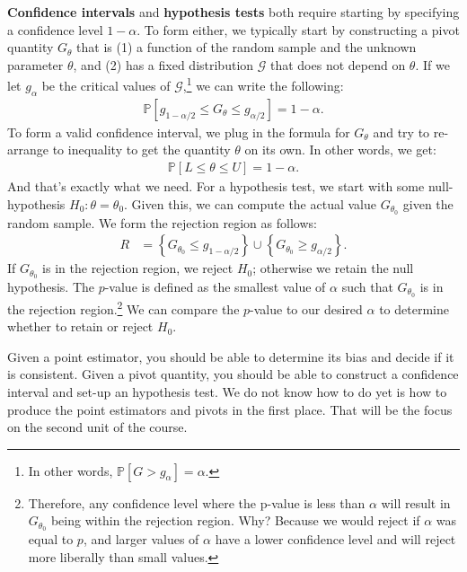 \documentclass{tufte-handout}
\begin{document}
\textbf{Confidence intervals} and \textbf{hypothesis tests}
both require starting by specifying a confidence level $1-\alpha$.
To form either, we typically start by constructing a pivot quantity
$G_\theta$ that is (1) a function of the random sample and the unknown
parameter $\theta$, and (2) has a fixed distribution $\mathcal{G}$
that does not depend on $\theta$. If we let $g_{\alpha}$ be the
critical values of $\mathcal{G}$,\footnote{
  In other words, $\mathbb{P}[G > g_{\alpha}] = \alpha$.
}
we can write the following:
\begin{align*}
\mathbb{P} \left[ g_{1 - \alpha/2} \leq G_\theta \leq g_{\alpha/2} \right] = 1 - \alpha.
\end{align*}
To form a valid confidence interval, we plug in the formula for $G_\theta$
and try to re-arrange to inequality to get the quantity $\theta$ on its
own. In other words, we get:
\begin{align*}
\mathbb{P} \left[ L \leq \theta \leq U \right] = 1 - \alpha.
\end{align*}
And that's exactly what we need. For a hypothesis test, we start with
some null-hypothesis $H_0: \theta = \theta_0$. Given this, we can
compute the actual value $G_{\theta_0}$ given the random sample. We
form the rejection region as follows:
\begin{align*}
R &= \left\{ G_{\theta_0} \leq g_{1-\alpha/2} \right\} \cup \left\{ G_{\theta_0} \geq g_{\alpha/2} \right\}.
\end{align*}
If $G_{\theta_0}$ is in the rejection region, we reject $H_0$; otherwise
we retain the null hypothesis. The $p$-value is defined as the
smallest value of $\alpha$ such that $G_{\theta_0}$ is in the rejection
region.\footnote{
  Therefore, any confidence level where the p-value is less than
  $\alpha$ will result in $G_{\theta_0}$ being within the rejection
  region. Why? Because we would reject if $\alpha$ was equal to
  $p$, and larger values of $\alpha$ have a lower confidence level
  and will reject more liberally than small values.
}
We can compare the $p$-value to our desired $\alpha$ to determine
whether to retain or reject $H_0$.

\vspace*{18pt}

\noindent
Given a point estimator, you should be able to determine its bias and
decide if it is consistent. Given a pivot quantity, you should be able
to construct a confidence interval and set-up an hypothesis test. We
do not know how to do yet is how to produce the point estimators and
pivots in the first place. That will be the focus on the second unit of
the course. 


\end{document}
